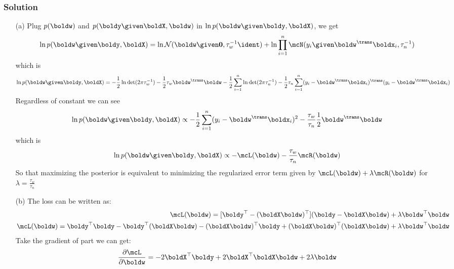 \documentclass[submit]{harvardml}
\begin{document}
\subsubsection*{Solution}
\begin{itemize}
\item[(a)] Plug $p(\boldw)$ and $p(\boldy \given \boldX, \boldw)$ in $\ln p(\boldw \given \boldy, \boldX)$, we get
\begin{align*}
\ln p(\boldw \given \boldy, \boldX)=  \ln \mathcal{N}(\boldw \given \bold0, \tau_w^{-1}\ident ) + \ln \prod_{i=1}^n \mcN(y_i \given \boldw^\trans \boldx_i, \tau_n^{-1})
\end{align*}
which is
\begin{align*}
\ln p(\boldw \given \boldy, \boldX)= -\frac{1}{2} \ln \text{det}(2 \pi \tau_w^{-1})- \frac{1}{2} \tau_w \boldw^\trans \boldw -\frac{1}{2}\sum_{i = 1}^n\ln \text{det}(2 \pi \tau_n^{-1}) - \frac{1}{2} \tau_n \sum_{i=1}^n (y_i - \boldw^\trans \boldx_i)^\trans (y_i - \boldw^\trans \boldx_i)
\end{align*}
Regardless of constant we can see
\begin{align*}
\ln p(\boldw \given \boldy, \boldX) \propto -\frac{1}{2}\sum_{i = 1}^n (y_i - \boldw^\trans \boldx_i)^2 -\frac{\tau_w}{\tau_n}\frac{1}{2}\boldw^\trans \boldw
\end{align*}
which is 
\begin{align*}
\ln p(\boldw \given \boldy, \boldX) \propto -\mcL(\boldw) -\frac{\tau_w}{\tau_n}\mcR(\boldw)
\end{align*}
So that maximizing the posterior is equivalent to minimizing the regularized error term given by $\mcL(\boldw) + \lambda \mcR(\boldw)$ for $\lambda=\frac{\tau_w}{\tau_n}$


\item[(b)]  The loss can be written as:
 \begin{align*}
 \mcL(\boldw) = [ \boldy^\top - (\boldX \boldw)^\top] (\boldy - \boldX
\boldw) + \lambda \boldw^\top \boldw  \\
\mcL(\boldw) = \boldy^\top \boldy - \boldy^\top(\boldX \boldw) - (\boldX \boldw)^\top \boldy + (\boldX \boldw)^\top(\boldX \boldw) + \lambda \boldw^\top \boldw 
 \end{align*}
 Take the gradient of part we can get:
 \begin{align*}
 \frac{\partial \mcL}{\partial \boldw} = -2\boldX^\top \boldy + 2\boldX^\top \boldX \boldw + 2 \lambda \boldw
 \end{align*}


\end{itemize}
\end{document}
